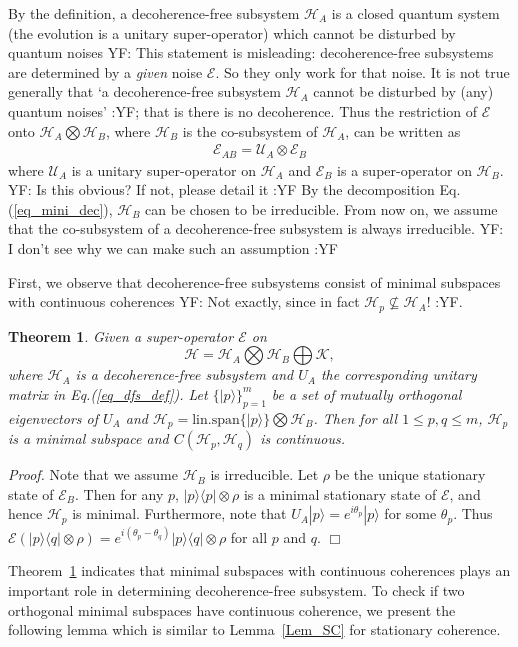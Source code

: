 \documentclass[journal]{IEEEtran}
\def\h{\ensuremath{\mathcal{H}}}
\def\u{\ensuremath{\mathcal{U}}}
\def\k{\ensuremath{\mathcal{K}}}
\def\u{\ensuremath{\mathcal{U}}}
\def\e{\ensuremath{\mathcal{E}}}
\def\k{\mathcal{K}}
\newtheorem{theorem}{Theorem}
\newcommand{\authorComment}[3]{\color{#1}#2: {#3} :#2\color{black}}
\newcommand{\yf}[1]{\authorComment{blue}{YF}{#1}}
\begin{document}
By the definition, a decoherence-free subsystem $\h_A$  is a closed quantum system (the evolution is a unitary super-operator) which cannot be disturbed by quantum noises \yf{This statement is misleading: decoherence-free subsystems are determined by a \emph{given} noise $\e$. So they only work for that noise. It is not true generally that `a decoherence-free subsystem $\h_A$ cannot be disturbed by (any) quantum noises'}; that is there is no decoherence. Thus the restriction of $\e$ onto $\h_A\bigotimes\h_B $, where $\h_B$ is the co-subsystem of $\h_A$, can be written as \begin{eqnarray}\label{eq_dfs_form}
  \e_{AB}=\u_A\otimes \e_{B}
\end{eqnarray} where $\u_A$ is a unitary super-operator on $\h_A$ and $\e_B$ is a super-operator on $\h_{B}.$ \yf{Is this obvious? If not, please detail it} By the decomposition Eq.(\ref{eq_mini_dec}), $\h_B$ can be chosen to be  irreducible. From now on, we assume that the co-subsystem of a decoherence-free subsystem is always irreducible. \yf{I don't see why we can make such an assumption}

First, we observe that  decoherence-free subsystems consist of minimal subspaces with continuous coherences \yf{Not exactly, since in fact $\h_p\not\subseteq \h_A$!}.
\begin{theorem}\label{Theo_dfs_cc}
    Given a super-operator $\e$ on 
    $$\h=\h_A\bigotimes\h_B\bigoplus \k,$$ where $\h_A$ is a decoherence-free subsystem and $U_A$ the corresponding unitary matrix in Eq.(\ref{eq_dfs_def}). Let  $\{|p\rangle\}_{p=1}^{m}$ be a set of mutually orthogonal eigenvectors of $U_A$ and $\h_p=\textrm{lin.span}\{|p\rangle\}\bigotimes \h_B$. Then for all $1\leq p,q\leq m$,  $\h_p$  is a minimal subspace and
    $C(\h_p,\h_q)$ is continuous.
  \end{theorem}  

{\it Proof.} Note that we assume $\h_B$ is irreducible. Let $\rho$ be the unique stationary state of $\e_B$.  Then for any $p$, $|p\rangle\langle p|\otimes \rho$ is a minimal stationary state of $\e$, and hence $\h_p$ is minimal. Furthermore, note that $U_A|p\rangle=e^{i\theta_p}|p\rangle$ for some $\theta_p$. Thus $\e(|p\rangle\langle q|\otimes \rho)=e^{i(\theta_p-\theta_q)}|p\rangle\langle q|\otimes \rho$ for all $p$ and $q.$
\hfill $\Box$

Theorem~\ref{Theo_dfs_cc} indicates that minimal subspaces with continuous coherences plays an important role in determining decoherence-free subsystem. To check if two orthogonal minimal subspaces have continuous coherence, we present the following lemma which is similar to Lemma~\ref{Lem_SC} for stationary coherence.
\end{document}
